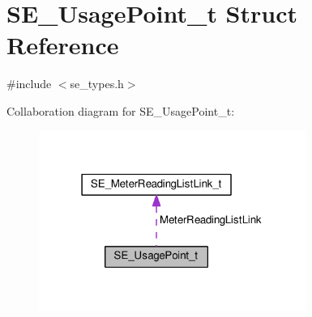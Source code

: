 \hypertarget{structSE__UsagePoint__t}{}\section{S\+E\+\_\+\+Usage\+Point\+\_\+t Struct Reference}
\label{structSE__UsagePoint__t}


{\ttfamily \#include $<$se\+\_\+types.\+h$>$}



Collaboration diagram for S\+E\+\_\+\+Usage\+Point\+\_\+t\+:\nopagebreak
\begin{figure}[H]
\begin{center}
\leavevmode
\includegraphics[width=247pt]{structSE__UsagePoint__t__coll__graph}
\end{center}
\end{figure}
